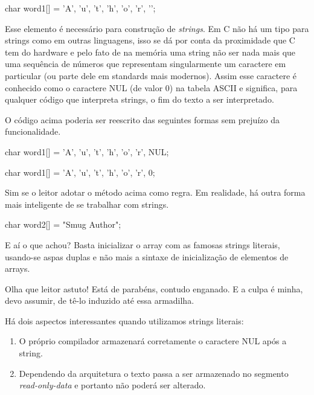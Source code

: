 \begin{ccode}
  char word1[] = {'A', 'u', 't', 'h', 'o', 'r', '\0'};
\end{ccode}


Esse elemento é necessário para construção de \textit{strings}. Em C não há um tipo para strings como em outras linguagens, isso se dá por conta da proximidade que C tem do hardware e pelo fato de na memória uma string não ser nada mais que uma sequência de números que representam singularmente um caractere em particular (ou parte dele em standards mais modernos). Assim esse caractere é conhecido como o caractere NUL (de valor 0) na tabela ASCII e significa, para qualquer código que interpreta strings, o fim do texto a ser interpretado.

O código acima poderia ser reescrito das seguintes formas sem prejuízo da funcionalidade.

\begin{ccode}
  char word1[] = {'A', 'u', 't', 'h', 'o', 'r', NUL};
\end{ccode}

\begin{ccode}
  char word1[] = {'A', 'u', 't', 'h', 'o', 'r', 0};
\end{ccode}


Sim se o leitor adotar o método acima como regra. Em realidade, há outra forma mais inteligente de se trabalhar com strings.

\begin{ccode}
  char word2[] = "Smug Author";
\end{ccode}

E aí o que achou? Basta inicializar o array com as famosas strings literais, usando-se aspas duplas e não mais a sintaxe de inicialização de elementos de arrays.


Olha que leitor astuto! Está de parabéns, contudo enganado. E a culpa é minha, devo assumir, de tê-lo induzido até essa armadilha.

Há dois aspectos interessantes quando utilizamos strings literais:
\begin{enumerate}
\item O próprio compilador armazenará corretamente o caractere NUL após a string.
\item Dependendo da arquitetura o texto passa a ser armazenado no segmento \textit{read-only-data} e portanto não poderá ser alterado.
\end{enumerate}

